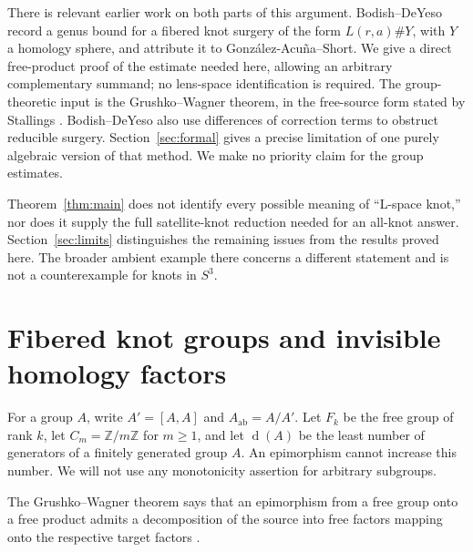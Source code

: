 \documentclass[11pt]{article}
\theoremstyle{remark}
\newcommand{\Z}{\mathbb Z}
\newcommand{\ab}{\mathrm{ab}}
\newcommand{\gen}{\operatorname{d}}
\begin{document}

There is relevant earlier work on both parts of this argument. Bodish--DeYeso \cite[Theorem~1.2]{BD} record a genus bound for a fibered knot surgery of the form $L(r,a)\#Y$, with $Y$ a homology sphere, and attribute it to Gonz\'alez-Acu\~na--Short. We give a direct free-product proof of the estimate needed here, allowing an arbitrary complementary summand; no lens-space identification is required. The group-theoretic input is the Grushko--Wagner theorem, in the free-source form stated by Stallings \cite[Section~1.B.5, p.~6]{Stallings}. Bodish--DeYeso also use differences of correction terms to obstruct reducible surgery. Section~\ref{sec:formal} gives a precise limitation of one purely algebraic version of that method. We make no priority claim for the group estimates.


Theorem~\ref{thm:main} does not identify every possible meaning of ``L-space knot,'' nor does it supply the full satellite-knot reduction needed for an all-knot answer. Section~\ref{sec:limits} distinguishes the remaining issues from the results proved here. The broader ambient example there concerns a different statement and is not a counterexample for knots in $S^3$.


\section{Fibered knot groups and invisible homology factors}\label{sec:groups}


For a group $A$, write $A'=[A,A]$ and $A_{\ab}=A/A'$. Let $F_k$ be the free group of rank $k$, let $C_m=\Z/m\Z$ for $m\geq1$, and let $\gen(A)$ be the least number of generators of a finitely generated group $A$. An epimorphism cannot increase this number. 
We will not use any monotonicity assertion for arbitrary subgroups.

The Grushko--Wagner theorem says that an epimorphism from a free group onto a free product admits a decomposition of the source into free factors mapping onto the respective target factors \cite[Section~1.B.5]{Stallings}. 
\end{document}
